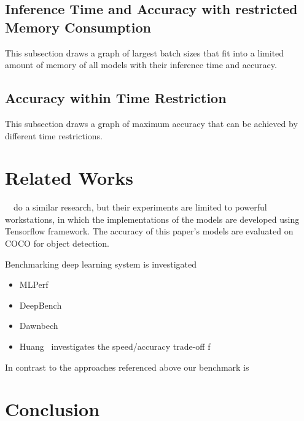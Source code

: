 \documentclass[conference]{IEEEtran}
\begin{document}
\subsection{Inference Time and Accuracy with restricted Memory Consumption}
This subsection draws a graph of largest batch sizes that fit into a limited amount of memory of all models with their inference time and accuracy.

\subsection{Accuracy within Time Restriction}
This subsection draws a graph of maximum accuracy that can be achieved by different time restrictions. 

\section{Related Works}
~\cite{huang2017speed}~do a similar research, but their experiments are limited to powerful workstations, in which the implementations of the models are developed using Tensorflow framework. The accuracy of this paper's models are evaluated on COCO for object detection.

Benchmarking deep learning system is investigated

\begin{itemize}
    \item MLPerf
    \item DeepBench
    \item Dawnbech
    \item Huang~\cite{DBLP:journals/corr/HuangRSZKFFWSG016} investigates the speed/accuracy trade-off f
\end{itemize}

In contrast to the approaches referenced above our benchmark is 


\section{Conclusion}



%





\end{document}
